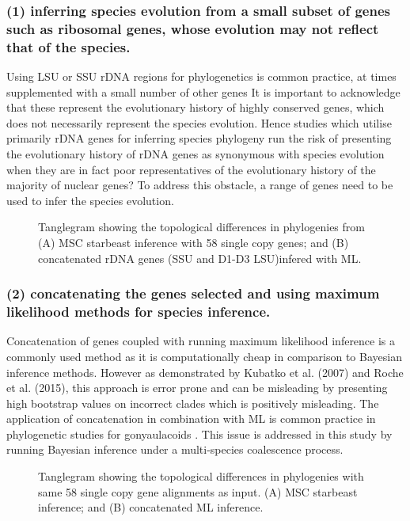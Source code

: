 \documentclass[12pt]{article}
\begin{document}
\subsubsection*{(1) inferring species evolution from a small subset of genes such as ribosomal genes, whose evolution may not reflect that of the species.}
Using LSU or SSU rDNA regions for phylogenetics is common practice, at times supplemented with a small number of other genes \cite{shalchian2006combined,zhang2007three,saldarriaga2004molecular,murray2005improving,hoppenrath2010dinoflagellate} 
It is important to acknowledge that these represent the evolutionary history of highly conserved genes, which does not necessarily represent the species evolution. 
Hence studies which utilise primarily rDNA genes for inferring species phylogeny run the risk of presenting the evolutionary history of rDNA genes as synonymous with species evolution when they are in fact poor representatives of the evolutionary history of the majority of nuclear genes?
To address this obstacle, a range of genes need to be used to infer the species evolution.

\FloatBarrier 
\begin{figure} 
\caption{Tanglegram showing the topological differences in phylogenies from (A) MSC starbeast inference with 58 single copy genes; and (B) concatenated rDNA genes (SSU and D1-D3 LSU)infered with ML.} 
\label{fig:tanglerdna}
\end{figure} 
\FloatBarrier

\subsubsection*{(2) concatenating the genes selected and using maximum likelihood methods for species inference.}
Concatenation of genes coupled with running maximum likelihood inference is a commonly used method as it is computationally cheap in comparison to Bayesian inference methods. 
However as demonstrated by Kubatko et al. (2007) and Roche et al. (2015), this approach is error prone and can be misleading by presenting high bootstrap values on incorrect clades which is positively misleading.
The application of concatenation in combination with ML is common practice in phylogenetic studies for gonyaulacoids  \cite{shalchian2006combined,zhang2007three,saldarriaga2004molecular,murray2005improving,hoppenrath2010dinoflagellate}.
This issue is addressed in this study by running Bayesian inference under a multi-species coalescence process.
\FloatBarrier 
\begin{figure} 
\caption{Tanglegram showing the topological differences in phylogenies with same 58 single copy gene alignments as input. (A) MSC starbeast inference; and (B) concatenated ML inference.} 
\label{fig:tangleconcat}
\end{figure} 
\FloatBarrier
\end{document}

